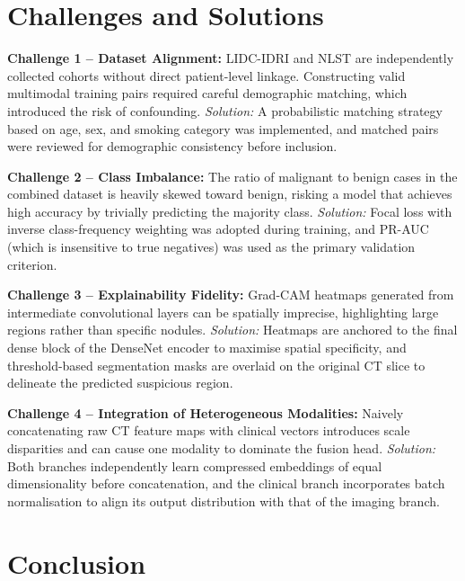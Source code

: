 {%

\section{Challenges and Solutions}

\textbf{Challenge 1 -- Dataset Alignment:} LIDC-IDRI and NLST are independently collected cohorts without direct patient-level linkage. Constructing valid multimodal training pairs required careful demographic matching, which introduced the risk of confounding.
\textit{Solution:} A probabilistic matching strategy based on age, sex, and smoking category was implemented, and matched pairs were reviewed for demographic consistency before inclusion.

\textbf{Challenge 2 -- Class Imbalance:} The ratio of malignant to benign cases in the combined dataset is heavily skewed toward benign, risking a model that achieves high accuracy by trivially predicting the majority class.
\textit{Solution:} Focal loss with inverse class-frequency weighting was adopted during training, and PR-AUC (which is insensitive to true negatives) was used as the primary validation criterion.

\textbf{Challenge 3 -- Explainability Fidelity:} Grad-CAM heatmaps generated from intermediate convolutional layers can be spatially imprecise, highlighting large regions rather than specific nodules.
\textit{Solution:} Heatmaps are anchored to the final dense block of the DenseNet encoder to maximise spatial specificity, and threshold-based segmentation masks are overlaid on the original CT slice to delineate the predicted suspicious region.

\textbf{Challenge 4 -- Integration of Heterogeneous Modalities:} Naively concatenating raw CT feature maps with clinical vectors introduces scale disparities and can cause one modality to dominate the fusion head.
\textit{Solution:} Both branches independently learn compressed embeddings of equal dimensionality before concatenation, and the clinical branch incorporates batch normalisation to align its output distribution with that of the imaging branch.


\section{Conclusion}

}
